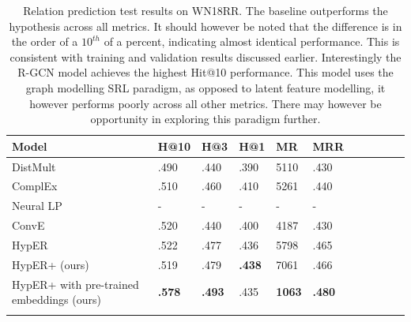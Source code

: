 
\begin{table}[H]
		\centering
		\begin{tabular}{lllllllllll}
  			\textbf{Model} & \textbf{H@10} & \textbf{H@3} & \textbf{H@1} & \textbf{MR} & \textbf{MRR} \\
  			\hline
  			DistMult \unskip~\citep{yang2014embedding} & .490 & .440 & .390 & 5110 & .430 \\
  			ComplEx \unskip~\citep{trouillon2016complex} & .510 & .460 & .410 & 5261 & .440 \\
  			Neural LP \unskip~\citep{yang2017differentiable} & - & - & - & - & - \\
			ConvE \unskip~\citep{dettmers2018convolutional} & .520 & .440 & .400 & 4187 & .430 \\
			HypER \unskip~\citep{balazevic2019hypernetwork} & .522 & .477 & .436 & 5798 & .465 \\
			HypER+ (ours) & .519 & .479 & \textbf{.438} & 7061 & .466 \\
  			\hline
  			HypER+ with pre-trained embeddings (ours) & \textbf{.578} & \textbf{.493} & .435 & \textbf{1063} & \textbf{.480} \\
			&
		\end{tabular}
		\captionsetup{justification=centering}
		\caption{Relation prediction test results on WN18RR. The baseline outperforms the hypothesis across all metrics. It should however be noted that the difference is in the order of a $ 10^{th} $ of a percent, indicating almost identical performance. This is consistent with training and validation results discussed earlier. Interestingly the R-GCN model achieves the highest Hit@10 performance. This model uses the graph modelling SRL paradigm, as opposed to latent feature modelling, it however performs poorly across all other metrics. There may however be opportunity in exploring this paradigm further. }
\end{table}

